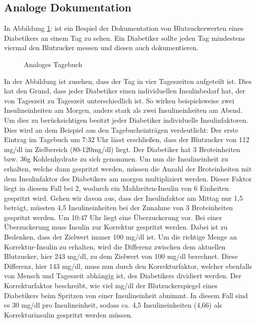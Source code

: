 \documentclass[a4paper,11pt]{article}%
\renewcommand{\\}{\vspace*{0.5\baselineskip} \newline}
\begin{document}
	\subsection{Analoge Dokumentation}
	In Abbildung \ref{img:tagebuch}:  ist ein Bespiel der Dokumentation von Blutzuckerwerten eines Diabetikers an einem Tag zu sehen. Ein Diabetiker sollte jeden Tag mindestens viermal den Blutzucker messen und diesen auch dokumentieren.
	\begin{figure}[H]
		\centering
		\setlength{\fboxsep}{1pt}
		\setlength{\fboxrule}{1pt}
		\captionsetup{justification=centering}
		\caption{Analoges Tagebuch}
		\label{img:tagebuch}
	\end{figure}
	In der Abbildung ist zusehen, dass der Tag in vier Tageszeiten aufgeteilt ist. Dies hat den Grund, dass jeder Diabetiker einen individuellen Insulinbedarf hat, der von Tageszeit zu Tageszeit unterschiedlich ist. So wirken beispielsweise zwei Insulineinheiten am Morgen, anders stark als zwei Insulineinheiten am Abend. Um dies zu berücksichtigen besitzt jeder Diabetiker individuelle Insulinfaktoren. Dies wird an dem Beispiel aus den Tagebucheinträgen verdeutlicht:\\
	Der erste Eintrag im Tagebuch um 7:32 Uhr lässt erschließen, dass der Blutzucker von 112 mg/dl im Zielbereich (80-120mg/dl) liegt. Der Diabetiker hat 3 Broteinheiten bzw. 36g Kohlenhydrate zu sich genommen. Um nun die Insulineinheit zu erhalten, welche dann gespritzt werden, müssen die Anzahl der Broteinheiten mit dem Insulinfaktor des Diabetikers am morgen multipliziert werden. Dieser Faktor liegt in diesem Fall bei 2, wodurch ein Mahlzeiten-Insulin von 6 Einheiten gespritzt wird.\newline
	Gehen wir davon aus, dass der Insulinfaktor am Mittag nur 1,5 beträgt, müssten 4,5 Insulineinheiten bei der Zunahme von 3 Broteinheiten gespritzt werden.\newline
	Um 10:47 Uhr liegt eine Überzuckerung vor. Bei einer Überzuckerung muss Insulin zur Korrektur gespritzt werden. Dabei ist zu Bedenken, dass der Zielwert immer 100 mg/dl ist. Um die richtige Menge an Korrektur-Insulin zu erhalten, wird die Differenz zwischen dem aktuellen Blutzucker, hier 243 mg/dl, zu dem Zielwert von 100 mg/dl berechnet. Diese Differenz, hier 143 mg/dl, muss nun durch den Korrekturfaktor, welcher ebenfalls von Mensch und Tageszeit abhängig ist, des Diabetikers dividiert werden. Der Korrekturfaktor beschreibt, wie viel mg/dl der Blutzuckerspiegel eines Diabetikers beim Spritzen von einer Insulineinheit abnimmt. In diesem Fall sind es 30 mg/dl pro Insulineinheit, sodass ca. 4,5 Insulineinheiten (4,66) als Korrekturinsulin gespritzt werden müssen.\newline
\end{document}
